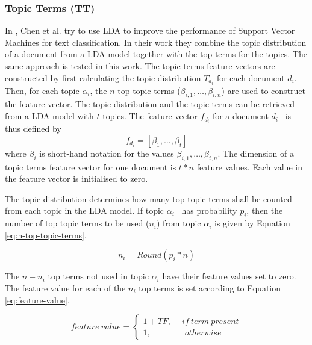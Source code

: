 \subsubsection{Topic Terms (TT)} \label{sec:theory-topic-terms}
In \cite{Chen2016}, Chen et al. try to use LDA to improve the performance of Support Vector Machines for text classification.
In their work they combine the topic distribution of a document from a LDA model together with the top terms for the topics.
The same approach is tested in this work.
The topic terms feature vectors are constructed by first calculating the topic distribution $T_{d_i}$ for each document $d_i$.
Then, for each topic $\alpha_i$, the $n$ top topic terms ($\beta_{i, 1}, \ldots, \beta_{i, n}$) are used to construct the feature vector.
The topic distribution and the topic terms can be retrieved from a LDA model with $t$ topics.
The feature vector $f_{d_i}$ for a document $d_i$  is thus defined by 
\begin{equation*}
    f_{d_i}=[\beta_1, \ldots, \beta_t]
\end{equation*}
where $\beta_i$ is short-hand notation for the values $\beta_{i, 1}, \ldots, \beta_{i, n}$. 
The dimension of a topic terms feature vector for one document is $t*n$ feature values.
Each value in the feature vector is initialised to zero.

The topic distribution determines how many top topic terms shall be counted from each topic in the LDA model.
If topic $\alpha_i$  has probability $p_i$, then the number of top topic terms to be used ($n_i$) from topic $\alpha_i$ is given by Equation \ref{eq:n-top-topic-terms}.

\begin{equation} \label{eq:n-top-topic-terms}
    n_i=Round(p_i*n)
\end{equation}

The $n-n_i$ top terms not used in topic $\alpha_i$ have their feature values set to zero.
The feature value for each of the $n_i$ top terms is set according to Equation \ref{eq:feature-value}.

\begin{equation} \label{eq:feature-value}
    feature\ value =\left\{
                \begin{array}{ll}
                  1+TF, \quad \ if\ term\ present\\
                  1, \qquad\qquad otherwise
                \end{array}
              \right.
\end{equation}

